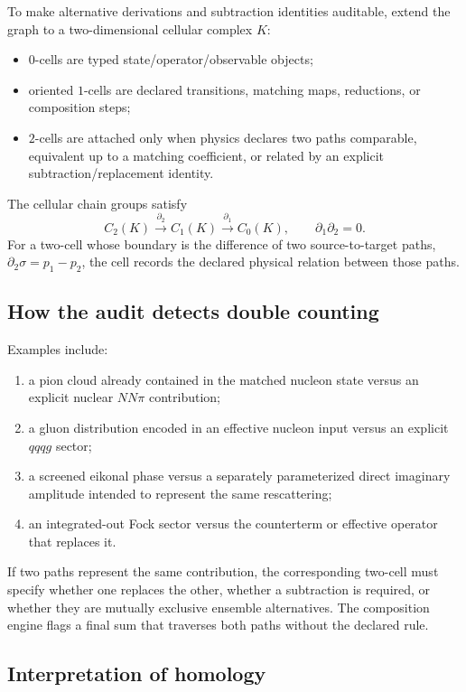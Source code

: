\documentclass[11pt]{article}
\begin{document}
To make alternative derivations and subtraction identities auditable, extend
the graph to a two-dimensional cellular complex \(K\):
\begin{itemize}
\item \(0\)-cells are typed state/operator/observable objects;
\item oriented \(1\)-cells are declared transitions, matching maps,
reductions, or composition steps;
\item \(2\)-cells are attached only when physics declares two paths
comparable, equivalent up to a matching coefficient, or related by an
explicit subtraction/replacement identity.
\end{itemize}
The cellular chain groups satisfy
\begin{equation}
 C_2(K)\xrightarrow{\partial_2}C_1(K)
 \xrightarrow{\partial_1}C_0(K),
 \qquad
 \partial_1\partial_2=0.
\label{eq:provenance-chain-complex}
\end{equation}
For a two-cell whose boundary is the difference of two source-to-target
paths, \(\partial_2\sigma=p_1-p_2\), the cell records the declared physical
relation between those paths.

\subsection{How the audit detects double counting}

Examples include:
\begin{enumerate}
\item a pion cloud already contained in the matched nucleon state versus an
explicit nuclear \(NN\pi\) contribution;
\item a gluon distribution encoded in an effective nucleon input versus an
explicit \(qqqg\) sector;
\item a screened eikonal phase versus a separately parameterized direct
imaginary amplitude intended to represent the same rescattering;
\item an integrated-out Fock sector versus the counterterm or effective
operator that replaces it.
\end{enumerate}
If two paths represent the same contribution, the corresponding two-cell must
specify whether one replaces the other, whether a subtraction is required, or
whether they are mutually exclusive ensemble alternatives.  The composition
engine flags a final sum that traverses both paths without the declared rule.

\subsection{Interpretation of homology}
\end{document}
